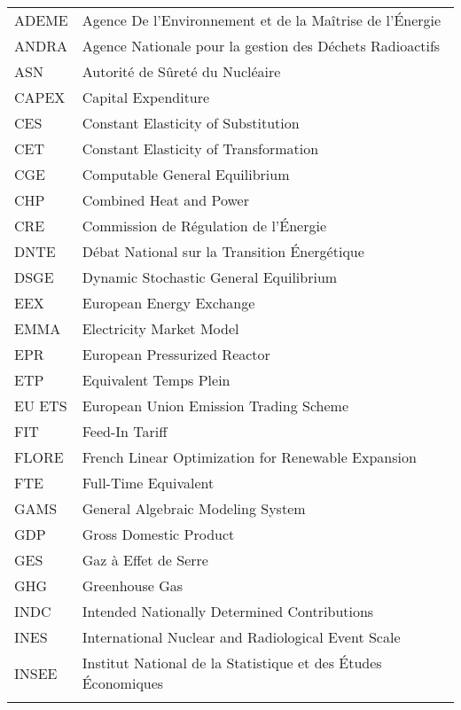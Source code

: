 \begin{tabular}{ p{} p{} }

ADEME & Agence De l'Environnement et de la Maîtrise de l'Énergie \\
ANDRA & Agence Nationale pour la gestion des Déchets Radioactifs \\
ASN & Autorité de Sûreté du Nucléaire \\
CAPEX & Capital Expenditure \\
CES & Constant Elasticity of Substitution \\
CET & Constant Elasticity of Transformation \\
CGE & Computable General Equilibrium \\
CHP & Combined Heat and Power \\
CRE & Commission de Régulation de l'Énergie \\
DNTE & Débat National sur la Transition Énergétique \\
DSGE & Dynamic Stochastic General Equilibrium \\
EEX & European Energy Exchange \\
EMMA & Electricity Market Model \\
EPR & European Pressurized Reactor \\
ETP & Equivalent Temps Plein \\
EU ETS & European Union Emission Trading Scheme \\
FIT & Feed-In Tariff \\
FLORE & French Linear Optimization for Renewable Expansion \\
FTE & Full-Time Equivalent \\
GAMS & General Algebraic Modeling System \\
GDP & Gross Domestic Product \\
GES & Gaz à Effet de Serre \\
GHG & Greenhouse Gas \\
INDC & Intended Nationally Determined Contributions \\
INES &  International Nuclear and Radiological Event Scale \\
INSEE & Institut National de la Statistique et des Études Économiques \\
\tabularnewline
\end{tabular}


